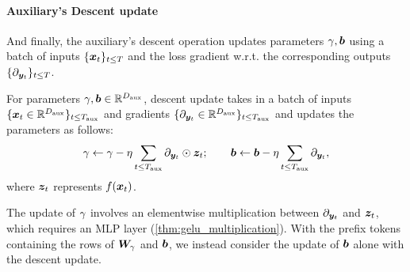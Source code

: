 




\paragraph{Auxiliary's Descent update} 

And finally, the auxiliary's descent operation updates parameters $\mathbf{\gamma}, {\bm{b}}$ using a batch of inputs $\{{\bm{x}}_t\}_{t \le T}$ and the loss gradient w.r.t. the corresponding outputs $\{ \partial_{{\bm{y}}_t} \}_{t \le T}$.

\begin{definition}\label{def:layernorm_descent}
    For parameters $\mathbf{\gamma}, {\bm{b}} \in \mathbb{R}^{D_{\text{aux}}}$, descent update takes in a batch of inputs $\{ {\bm{x}}_t \in \mathbb{R}^{D_{\text{aux}}} \}_{t \le {T_{\text{aux}}}}$ and gradients $\{ \partial_{{\bm{y}}_t} \in \mathbb{R}^{D_{\text{aux}}} \}_{t \le {T_{\text{aux}}}}$ and updates the parameters as follows:
    \begin{align*}
        \mathbf{\gamma} \gets \mathbf{\gamma} - \eta \sum_{t \le {T_{\text{aux}}}} \partial_{{\bm{y}}_t} \odot {\bm{z}}_t; \quad \quad
        {\bm{b}} \gets {\bm{b}} - \eta \sum_{t \le {T_{\text{aux}}}} \partial_{{\bm{y}}_t},
    \end{align*}
    where ${\bm{z}}_t$ represents $f({\bm{x}}_t)$.
\end{definition}

The update of $\mathbf{\gamma}$ involves an elementwise multiplication between $\partial_{{\bm{y}}_t}$ and ${\bm{z}}_t$, which requires an MLP layer (\cref{thm:gelu_multiplication}). %
With the prefix tokens containing the rows of ${\bm{W}}_{\mathbf{\gamma}}$ and ${\bm{b}}$, we instead consider the update of ${\bm{b}}$ alone with the descent update. 




